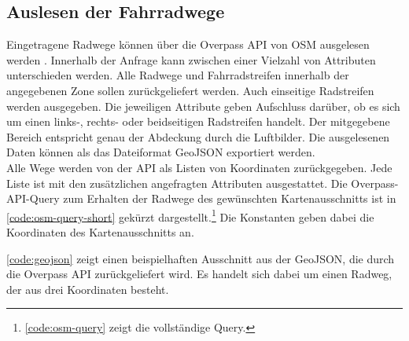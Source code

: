 \subsection{Auslesen der Fahrradwege} \label{subsec:overpass-api}

Eingetragene Radwege können über die Overpass API von \ac{OSM} ausgelesen werden \cites{.05.10.2021}{OpenStreetMapcontributors.2017}.
Innerhalb der Anfrage kann zwischen einer Vielzahl von Attributen unterschieden werden.
Alle Radwege und Fahrradstreifen innerhalb der angegebenen Zone sollen zurückgeliefert werden.
Auch einseitige Radstreifen werden ausgegeben. 
Die jeweiligen Attribute geben Aufschluss darüber, ob es sich um einen links-, rechts- oder beidseitigen Radstreifen handelt.
Der mitgegebene Bereich entspricht genau der Abdeckung durch die Luftbilder.
Die ausgelesenen Daten können als das Dateiformat GeoJSON exportiert werden. \\
Alle Wege werden von der API als Listen von Koordinaten zurückgegeben. Jede Liste ist mit den zusätzlichen angefragten 
Attributen ausgestattet. Die Overpass-API-Query zum Erhalten der Radwege des gewünschten Kartenausschnitts ist in 
\autoref{code:osm-query-short} gekürzt dargestellt.\footnote{\autoref{code:osm-query} zeigt die vollständige Query.} 
Die Konstanten geben dabei die Koordinaten des Kartenausschnitts an. 



\autoref{code:geojson} zeigt einen beispielhaften Ausschnitt aus der GeoJSON, die durch die Overpass API 
zurückgeliefert wird. Es handelt sich dabei um einen Radweg, der aus drei Koordinaten besteht. 




